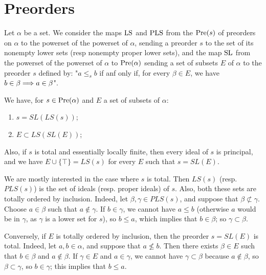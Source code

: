 



\section{Preorders}

Let $\alpha$ be a set. We consider the maps $\mathrm{LS}$ and $\mathrm{PLS}$ from the $\operatorname{Pre}(s)$ of preorders on $\alpha$ to the powerset of the powerset of $\alpha$, sending a preorder $s$ to the set
of its nonempty lower sets (resp nonempty proper lower sets), and the map $\mathrm{SL}$ from the powerset of the powerset of $\alpha$ to $\operatorname{Pre}(\alpha)$ sending a set of subsets $E$ of $\alpha$ to 
the preorder $s$ defined by: "$a \le_s b$ if anf only if, for every $\beta\in E$, we have $b\in\beta \Longrightarrow a \in\beta$".

We have, for $s\in\operatorname{Pre}(\alpha)$ and $E$ a set of subsets of $\alpha$:
\begin{enumerate}
\item $s=SL(LS(s))$;
\item $E\subset LS(SL(E))$;
\end{enumerate}
Also, if $s$ is total and essentially locally finite, then every ideal of $s$ is principal, and we have $E\cup\{\top\}=LS(s)$ for every $E$ such that $s=SL(E)$.

We are mostly interested in the case where $s$ is total. Then $LS(s)$ (resp. $PLS(s)$) is the set of ideals (resp. proper ideals) of $s$. Also, both these sets are totally ordered by inclusion.
Indeed, let $\beta,\gamma\in PLS(s)$, and suppose that $\beta\not\subset\gamma$. Choose $a\in\beta$ such that $a\not\in\gamma$. If $b\in\gamma$, we cannot have $a\le b$ (otherwise $a$ would be in
$\gamma$, as $\gamma$ is a lower set for $s$), so $b\le a$, which implies that $b\in\beta$; so $\gamma\subset\beta$. 

Conversely, if $E$ is totally ordered by inclusion, then the preorder $s=SL(E)$ is total. Indeed, let $a,b\in\alpha$, and suppose that $a\not\le b$. Then there exists
$\beta\in E$ such that $b\in\beta$ and $a\not\in\beta$. If $\gamma\in E$ and $a\in\gamma$, we cannot have $\gamma\subset\beta$ because $a\not\in\beta$, so $\beta\subset\gamma$,
so $b\in\gamma$; this implies that $b \le a$. 

